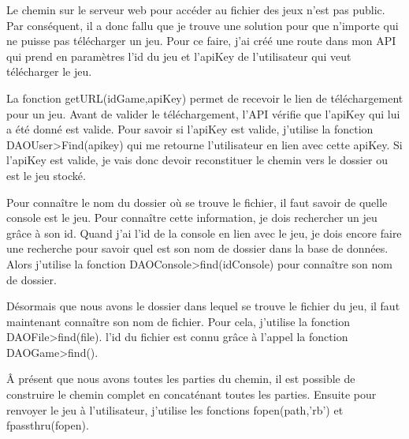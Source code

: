 \documentclass[a4paper,12pt,french]{sphinxmanual}
\begin{document}
\sphinxAtStartPar
Le chemin sur le serveur web pour accéder au fichier des jeux n’est pas public. Par conséquent, il a donc fallu que je trouve une solution pour que n’importe qui ne puisse pas télécharger un jeu. Pour ce faire, j’ai créé une route dans mon API qui prend en paramètres l’id du jeu et l’apiKey de l’utilisateur qui veut télécharger le jeu.

\sphinxAtStartPar
La fonction getURL(idGame,apiKey) permet de recevoir le lien de téléchargement pour un jeu. Avant de valider le téléchargement, l’API vérifie que l’apiKey qui lui a été donné est valide. Pour savoir si l’apiKey est valide, j’utilise la fonction DAOUser\sphinxhyphen{}>Find(apikey) qui me retourne l’utilisateur en lien avec cette apiKey. Si l’apiKey est valide, je vais donc devoir reconstituer le chemin vers le dossier ou est le jeu stocké.

\sphinxAtStartPar
Pour connaître le nom du dossier où se trouve le fichier, il faut savoir de quelle console est le jeu. Pour connaître cette information, je dois rechercher un jeu grâce à son id. Quand j’ai l’id de la console en lien avec le jeu, je dois encore faire une recherche pour savoir quel est son nom de dossier dans la base de données. Alors j’utilise la fonction DAOConsole\sphinxhyphen{}>find(idConsole) pour connaître son nom de dossier.

\sphinxAtStartPar
Désormais que nous avons le dossier dans lequel se trouve le fichier du jeu, il faut maintenant connaître son nom de fichier. Pour cela, j’utilise la fonction DAOFile\sphinxhyphen{}>find(file). l’id du fichier est connu grâce à l’appel la fonction DAOGame\sphinxhyphen{}>find().

\sphinxAtStartPar
Â présent que nous avons toutes les parties du chemin, il est possible de construire le chemin complet en concaténant toutes les parties. Ensuite pour renvoyer le jeu à l’utilisateur, j’utilise les fonctions fopen(path,’rb’) et fpassthru(fopen).
\end{document}
